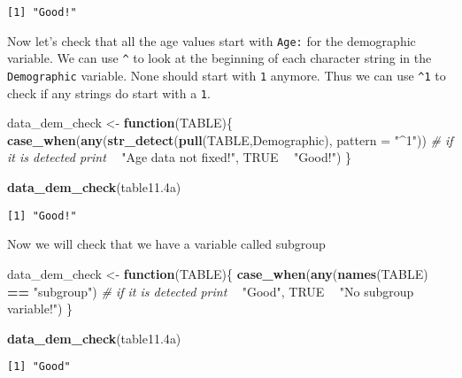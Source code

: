 \documentclass[
]{article}
\newenvironment{Shaded}{\begin{snugshade}}{\end{snugshade}}
\newcommand{\CommentTok}[1]{\textcolor[rgb]{0.56,0.35,0.01}{\textit{#1}}}
\newcommand{\ControlFlowTok}[1]{\textcolor[rgb]{0.13,0.29,0.53}{\textbf{#1}}}
\newcommand{\DataTypeTok}[1]{\textcolor[rgb]{0.13,0.29,0.53}{#1}}
\newcommand{\FloatTok}[1]{\textcolor[rgb]{0.00,0.00,0.81}{#1}}
\newcommand{\KeywordTok}[1]{\textcolor[rgb]{0.13,0.29,0.53}{\textbf{#1}}}
\newcommand{\NormalTok}[1]{#1}
\newcommand{\OperatorTok}[1]{\textcolor[rgb]{0.81,0.36,0.00}{\textbf{#1}}}
\newcommand{\OtherTok}[1]{\textcolor[rgb]{0.56,0.35,0.01}{#1}}
\newcommand{\StringTok}[1]{\textcolor[rgb]{0.31,0.60,0.02}{#1}}
\begin{document}
\begin{verbatim}
[1] "Good!"
\end{verbatim}

Now let's check that all the age values start with \texttt{Age:} for the
demographic variable. We can use \texttt{\^{}} to look at the beginning
of each character string in the \texttt{Demographic} variable. None
should start with \texttt{1} anymore. Thus we can use \texttt{\^{}1} to
check if any strings do start with a \texttt{1}.

\begin{Shaded}
\begin{Highlighting}[]
\NormalTok{data_dem_check <-}\StringTok{ }\ControlFlowTok{function}\NormalTok{(TABLE)\{}
  \KeywordTok{case_when}\NormalTok{(}\KeywordTok{any}\NormalTok{(}\KeywordTok{str_detect}\NormalTok{(}\KeywordTok{pull}\NormalTok{(TABLE,Demographic), }\DataTypeTok{pattern =} \StringTok{"^1"}\NormalTok{))}
  \CommentTok{# if it is detected print }
         \OperatorTok{~}\StringTok{ "Age data not fixed!"}\NormalTok{,}
    \OtherTok{TRUE} \OperatorTok{~}\StringTok{ "Good!"}\NormalTok{)}
\NormalTok{\}}


\KeywordTok{data_dem_check}\NormalTok{(table11}\FloatTok{.4}\NormalTok{a)}
\end{Highlighting}
\end{Shaded}

\begin{verbatim}
[1] "Good!"
\end{verbatim}

Now we will check that we have a variable called subgroup

\begin{Shaded}
\begin{Highlighting}[]
\NormalTok{data_dem_check <-}\StringTok{ }\ControlFlowTok{function}\NormalTok{(TABLE)\{}
  \KeywordTok{case_when}\NormalTok{(}\KeywordTok{any}\NormalTok{(}\KeywordTok{names}\NormalTok{(TABLE) }\OperatorTok{==}\StringTok{ "subgroup"}\NormalTok{)}
  \CommentTok{# if it is detected print }
         \OperatorTok{~}\StringTok{ "Good"}\NormalTok{,}
    \OtherTok{TRUE} \OperatorTok{~}\StringTok{ "No subgroup variable!"}\NormalTok{)}
\NormalTok{\}}

\KeywordTok{data_dem_check}\NormalTok{(table11}\FloatTok{.4}\NormalTok{a)}
\end{Highlighting}
\end{Shaded}

\begin{verbatim}
[1] "Good"
\end{verbatim}
\end{document}
